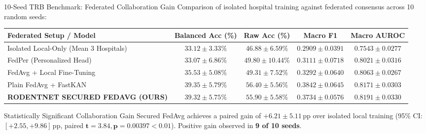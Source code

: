\documentclass[aspectratio=169,10pt]{beamer}
\begin{document}
\begin{frame}{10-Seed TRB Benchmark: Federated Collaboration Gain}
  \scriptsize
  Comparison of isolated hospital training against federated consensus across 10 random seeds:
  \vspace{0.1cm}
  \begin{table}[h]
    \centering
    \tiny
    \begin{tabular}{@{}p{4.2cm}cccc@{}}
      \toprule
      \textbf{Federated Setup / Model} & \textbf{Balanced Acc (\%)} & \textbf{Raw Acc (\%)} & \textbf{Macro F1} & \textbf{Macro AUROC} \\
      \midrule
      Isolated Local-Only (Mean 3 Hospitals)          & $33.12 \pm 3.33\%$ & $46.88 \pm 6.59\%$ & $0.2909 \pm 0.0391$ & $0.7543 \pm 0.0277$ \\
      FedPer (Personalized Head)                     & $33.07 \pm 6.86\%$ & $49.80 \pm 10.44\%$ & $0.3111 \pm 0.0718$ & $0.8021 \pm 0.0316$ \\
      FedAvg + Local Fine-Tuning                     & $35.53 \pm 5.08\%$ & $49.31 \pm 7.52\%$ & $0.3292 \pm 0.0640$ & $0.8063 \pm 0.0267$ \\
      Plain FedAvg + FastKAN                         & $39.35 \pm 5.79\%$ & $56.40 \pm 5.56\%$ & $0.3842 \pm 0.0645$ & $0.8171 \pm 0.0303$ \\
      \midrule
      \textbf{RODENTNET SECURED FEDAVG (OURS)}       & $\mathbf{39.32 \pm 5.75\%}$ & $\mathbf{55.90 \pm 5.58\%}$ & $\mathbf{0.3734 \pm 0.0576}$ & $\mathbf{0.8191 \pm 0.0330}$ \\
      \bottomrule
    \end{tabular}
  \end{table}
  \begin{exampleblock}{Statistically Significant Collaboration Gain}
    \scriptsize
    Secured FedAvg achieves a paired gain of $\mathbf{+6.21 \pm 5.11}$\,pp over isolated local training (95\% CI: $[+2.55, +9.86]$\,pp, paired $\mathbf{t = 3.84, p = 0.00397 < 0.01}$). Positive gain observed in \textbf{9 of 10 seeds}.
  \end{exampleblock}
\end{frame}
\end{document}
